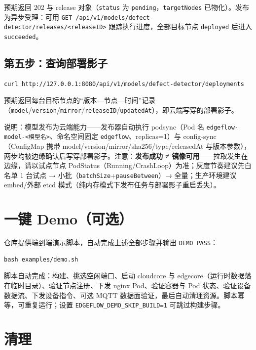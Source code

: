 预期返回 202 与 release 对象（\texttt{status} 为 \texttt{pending}，\texttt{targetNodes} 已物化）。发布为异步受理：可用 \texttt{GET /api/v1/models/defect-detector/releases/<releaseID>} 跟踪执行进度，全部目标节点 \texttt{deployed} 后进入 \texttt{succeeded}。

\subsection{第五步：查询部署影子}

\begin{lstlisting}
curl http://127.0.0.1:8080/api/v1/models/defect-detector/deployments
\end{lstlisting}

预期返回每台目标节点的\textquotedblleft 版本—节点—时间\textquotedblright 记录（\texttt{model}/\texttt{version}/\texttt{mirror}/\texttt{releaseID}/\texttt{updatedAt}），即云端写穿的部署影子。

说明：模型发布为云端能力——发布器自动执行 podsync（Pod 名 \texttt{edgeflow-model-<模型名>}、命名空间固定 \texttt{edgeflow}、replicas=1）与 config-sync（ConfigMap 携带 model/version/mirror/sha256/type/releasedAt 与版本参数），两步均被边缘确认后写穿部署影子。注意：\textbf{发布成功 ≠ 镜像可用}——拉取发生在边缘，请以试点节点 PodStatus（Running/CrashLoop）为准；灰度节奏建议先白名单 1 台试点 → 小批（\texttt{batchSize}+\texttt{pauseBetween}）→ 全量；生产环境建议 embed/外部 etcd 模式（纯内存模式下发布任务与部署影子重启丢失）。

\section{一键 Demo（可选）}

仓库提供端到端演示脚本，自动完成上述全部步骤并输出 \texttt{DEMO PASS}：

\begin{lstlisting}
bash examples/demo.sh
\end{lstlisting}

脚本自动完成：构建、挑选空闲端口、启动 cloudcore 与 edgecore（运行时数据落在临时目录）、验证节点注册、下发 nginx Pod、验证容器与 Pod 状态、验证设备数据流、下发设备指令、可选 MQTT 数据面验证，最后自动清理资源。脚本幂等，可重复运行；设置 \texttt{EDGEFLOW\_DEMO\_SKIP\_BUILD=1} 可跳过构建步骤。

\section{清理}

